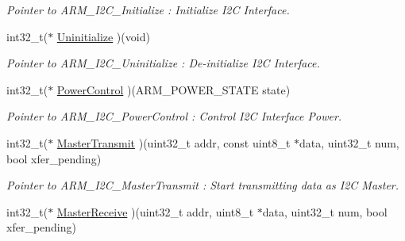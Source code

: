 \begin{DoxyCompactItemize}
\begin{DoxyCompactList}\small\item\em Pointer to A\+R\+M\+\_\+\+I2\+C\+\_\+\+Initialize \+: Initialize I2C Interface. \end{DoxyCompactList}\item 
\mbox{\label{struct___a_r_m___d_r_i_v_e_r___i2_c_a5ce2b3d7a3a07099bf07d1eb253e92e3}} 
int32\+\_\+t($\ast$ \mbox{\hyperlink{struct___a_r_m___d_r_i_v_e_r___i2_c_a5ce2b3d7a3a07099bf07d1eb253e92e3}{Uninitialize}} )(void)
\begin{DoxyCompactList}\small\item\em Pointer to A\+R\+M\+\_\+\+I2\+C\+\_\+\+Uninitialize \+: De-\/initialize I2C Interface. \end{DoxyCompactList}\item 
\mbox{\label{struct___a_r_m___d_r_i_v_e_r___i2_c_a24ebae5c6011631f76027f9a16eaf5ce}} 
int32\+\_\+t($\ast$ \mbox{\hyperlink{struct___a_r_m___d_r_i_v_e_r___i2_c_a24ebae5c6011631f76027f9a16eaf5ce}{Power\+Control}} )(A\+R\+M\+\_\+\+P\+O\+W\+E\+R\+\_\+\+S\+T\+A\+TE state)
\begin{DoxyCompactList}\small\item\em Pointer to A\+R\+M\+\_\+\+I2\+C\+\_\+\+Power\+Control \+: Control I2C Interface Power. \end{DoxyCompactList}\item 
\mbox{\label{struct___a_r_m___d_r_i_v_e_r___i2_c_a6ffcdd9c71d368c66fe07e553ce8cc23}} 
int32\+\_\+t($\ast$ \mbox{\hyperlink{struct___a_r_m___d_r_i_v_e_r___i2_c_a6ffcdd9c71d368c66fe07e553ce8cc23}{Master\+Transmit}} )(uint32\+\_\+t addr, const uint8\+\_\+t $\ast$data, uint32\+\_\+t num, bool xfer\+\_\+pending)
\begin{DoxyCompactList}\small\item\em Pointer to A\+R\+M\+\_\+\+I2\+C\+\_\+\+Master\+Transmit \+: Start transmitting data as I2C Master. \end{DoxyCompactList}\item 
\mbox{\label{struct___a_r_m___d_r_i_v_e_r___i2_c_a14b9319ae4830c98759e46119d7e8d80}} 
int32\+\_\+t($\ast$ \mbox{\hyperlink{struct___a_r_m___d_r_i_v_e_r___i2_c_a14b9319ae4830c98759e46119d7e8d80}{Master\+Receive}} )(uint32\+\_\+t addr, uint8\+\_\+t $\ast$data, uint32\+\_\+t num, bool xfer\+\_\+pending)

\end{DoxyCompactItemize}
